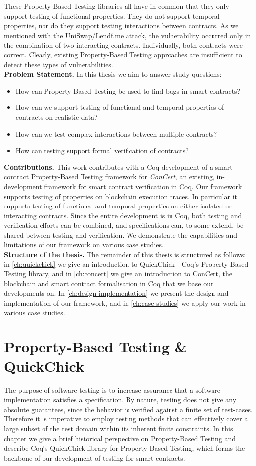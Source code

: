 \documentclass[twoside,11pt,openright]{report}
\newcommand{\pbt}{Property-Based Testing}
\begin{document}
These \pbt{} libraries all have in common that they only support testing of functional properties. They do not support temporal properties, nor do they support testing interactions between contracts. As we mentioned with the UniSwap/Lendf.me attack, the vulnerability occurred only in the combination of two interacting contracts. Individually, both contracts were correct. Clearly, existing \pbt{} approaches are insufficient to detect these types of vulnerabilities.
\medskip\\
\textbf{Problem Statement.}
In this thesis we aim to answer study questions:
\begin{itemize}
    \item How can \pbt{} be used to find bugs in smart contracts?
    \item How can we support testing of functional and temporal properties of contracts on realistic data?
    \item How can we test complex interactions between multiple contracts?
    \item How can testing support formal verification of contracts?
\end{itemize}
\textbf{Contributions.} This work contributes with a Coq development of a smart contract \pbt{} framework for \textit{ConCert}, an existing, in-development framework for smart contract verification in Coq. Our framework supports testing of properties on blockchain execution traces. In particular it supports testing of functional and temporal properties on either isolated or interacting contracts. Since the entire development is in Coq, both testing and verification efforts can be combined, and specifications can, to some extend, be shared between testing and verification. We demonstrate the capabilities and limitations of our framework on various case studies. \medskip\\
\textbf{Structure of the thesis.} The remainder of this thesis is structured as follows: in \autoref{ch:quickchick} we give an introduction to QuickChick - Coq's \pbt{} library, and in \autoref{ch:concert} we give an introduction to ConCert, the blockchain and smart contract formalisation in Coq that we base our developments on. In \autoref{ch:design-implementation} we present the design and implementation of our framework, and in \autoref{ch:case-studies} we apply our work in various case studies.


\chapter{Property-Based Testing \& QuickChick}
\label{ch:quickchick}
The purpose of software testing is to increase assurance that a software implementation satisfies a specification. By nature, testing does not give any absolute guarantees, since the behavior is verified against a finite set of test-cases. Therefore it is imperative to employ testing methods that can effectively cover a large subset of the test domain within its inherent finite constraints. In this chapter we give a brief historical perspective on \pbt{} and describe Coq's QuickChick library for \pbt{}, which forms the backbone of our development of testing for smart contracts.
\end{document}
